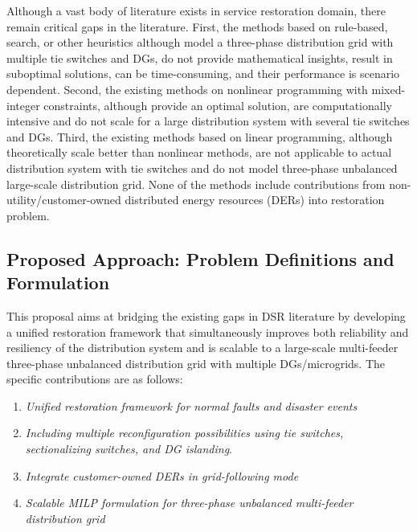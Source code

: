 \documentclass[12pt]{article}
\begin{document}
    Although a vast body of literature exists in service restoration domain, there remain critical gaps in the literature. First, the methods based on rule-based, search, or other heuristics although model a three-phase distribution grid with multiple tie switches and DGs, do not provide mathematical insights, result in suboptimal solutions, can be time-consuming, and their performance is scenario dependent. Second, the existing methods on nonlinear programming with mixed-integer constraints, although provide an optimal solution, are computationally intensive and do not scale for a large distribution system with several tie switches and DGs. Third, the existing methods based on linear programming, although theoretically scale better than nonlinear methods, are not applicable to actual distribution system with tie switches and do not model three-phase unbalanced large-scale distribution grid. None of the methods include contributions from non-utility/customer-owned distributed energy resources (DERs) into restoration problem. 
    
\subsection{Proposed Approach: Problem Definitions and Formulation}
This proposal aims at bridging the existing gaps in DSR literature by developing a unified restoration framework that simultaneously improves both reliability and resiliency of the distribution system and is scalable to a large-scale multi-feeder three-phase unbalanced distribution grid with multiple DGs/microgrids. The specific contributions are as follows:
\begin{enumerate}
        \item \textit{Unified restoration framework for normal faults and disaster events}
        \item \textit{Including multiple reconfiguration possibilities using tie switches, sectionalizing switches, and DG islanding}.
        \item \textit{Integrate customer-owned DERs in grid-following mode}  
        \item \textit{Scalable MILP formulation for three-phase unbalanced multi-feeder distribution grid}
\end{enumerate}
\end{document}
